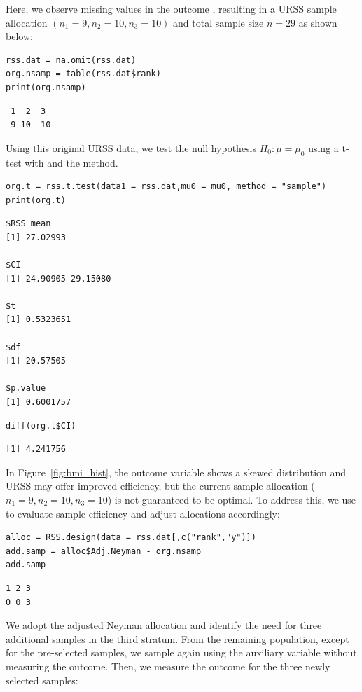 %
Here, we observe missing values in the outcome , resulting in a URSS sample allocation $(n_1=9, n_2=10, n_3=10)$ and total sample size $n=29$ as shown below:
%

\begin{verbatim}
rss.dat = na.omit(rss.dat)
org.nsamp = table(rss.dat$rank)
print(org.nsamp)
\end{verbatim}
\begin{verbatim}
 1  2  3 
 9 10  10 
\end{verbatim}

%
Using this original URSS data, we test the null hypothesis $H_0:\mu=\mu_0$ using a t-test with  and the  method.
%

\begin{verbatim}
org.t = rss.t.test(data1 = rss.dat,mu0 = mu0, method = "sample")
print(org.t)
\end{verbatim}
\begin{verbatim}
$RSS_mean
[1] 27.02993

$CI
[1] 24.90905 29.15080

$t
[1] 0.5323651

$df
[1] 20.57505

$p.value
[1] 0.6001757
\end{verbatim}
\begin{verbatim}
diff(org.t$CI) 
\end{verbatim}
\begin{verbatim}
[1] 4.241756
\end{verbatim}

%
In Figure~\ref{fig:bmi_hist}, the outcome variable shows a skewed distribution and URSS may offer improved efficiency, but the current sample allocation  ($n_1=9, n_2=10, n_3=10$) is not guaranteed to be optimal. To address this, we use  to evaluate sample efficiency and adjust allocations accordingly:
%

\begin{verbatim}
alloc = RSS.design(data = rss.dat[,c("rank","y")])
add.samp = alloc$Adj.Neyman - org.nsamp
add.samp
\end{verbatim}
\begin{verbatim}
1 2 3 
0 0 3
\end{verbatim}

%
We adopt the adjusted Neyman allocation  and identify the need for three additional samples in the third stratum. From the remaining population, except for the pre-selected samples, we sample again using the auxiliary variable without measuring the outcome. Then, we measure the outcome for the three newly selected samples:
%

